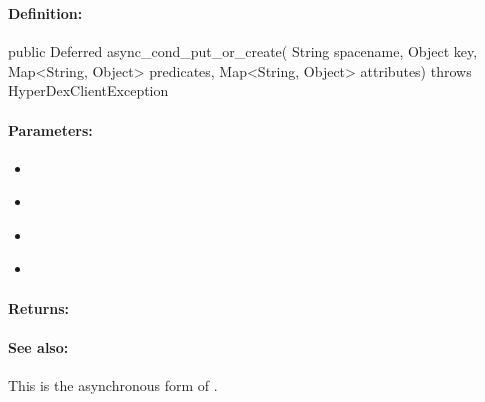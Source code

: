 \pagebreak
\subsubsection{}
\label{api:java:async_cond_put_or_create}


\paragraph{Definition:}
\begin{javacode}
public Deferred async_cond_put_or_create(
        String spacename,
        Object key,
        Map<String, Object> predicates,
        Map<String, Object> attributes) throws HyperDexClientException
\end{javacode}

\paragraph{Parameters:}
\begin{itemize}[noitemsep]
\item {}\\

\item {}\\

\item {}\\

\item {}\\

\end{itemize}

\paragraph{Returns:}


\paragraph{See also:}  This is the asynchronous form of .

\pagebreak
